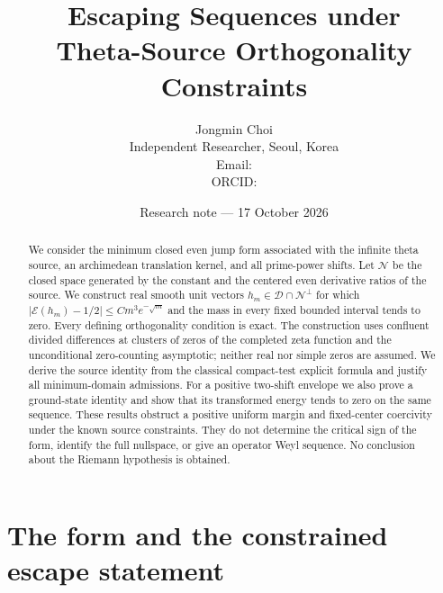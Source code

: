\documentclass[11pt,a4paper]{article}
\title{Escaping Sequences under\\Theta-Source Orthogonality Constraints}
\author{Jongmin Choi\\[2pt]
\small Independent Researcher, Seoul, Korea\\
\small Email: \href{mailto:\AuthorEmail}{\texttt{\AuthorEmail}}\\
\small ORCID: \href{https://orcid.org/\AuthorORCID}{\AuthorORCID}}
\date{Research note --- 17 October 2026}
\newcommand{\DD}{\mathcal D}
\newcommand{\EE}{\mathcal E}
\newcommand{\NN}{\mathcal N}
\newcommand{\abs}[1]{\lvert #1\rvert}
\theoremstyle{definition}
\theoremstyle{remark}
\numberwithin{equation}{section}
\begin{document}
\maketitle
\begin{abstract}
We consider the minimum closed even jump form associated with the infinite
theta source, an archimedean translation kernel, and all prime-power shifts.
Let $\NN$ be the closed space generated by the constant and the centered
even derivative ratios of the source. We construct real smooth unit vectors
$h_m\in\DD\cap\NN^\perp$ for which
$\abs{\EE(h_m)-1/2}\le C m^3e^{-\sqrt m}$ and the mass in every fixed
bounded interval tends to zero. Every defining orthogonality condition is
exact. The construction uses confluent divided differences at clusters of
zeros of the completed zeta function and the unconditional zero-counting
asymptotic; neither real nor simple zeros are assumed. We derive the source
identity from the classical compact-test explicit formula and justify all
minimum-domain admissions. For a positive two-shift envelope we also prove
a ground-state identity and show that its transformed energy tends to zero
on the same sequence. These results obstruct a positive uniform margin and
fixed-center coercivity under the known source constraints. They do not
determine the critical sign of the form, identify the full nullspace, or
give an operator Weyl sequence. No conclusion about the Riemann hypothesis
is obtained.
\end{abstract}

\section{The form and the constrained escape statement}\label{sec:setting}
\end{document}
